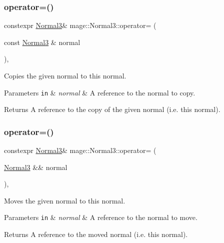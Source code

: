 \subsubsection{\texorpdfstring{operator=()}{operator=()}\hspace{0.1cm}{\footnotesize\ttfamily [1/2]}}
{\footnotesize\ttfamily constexpr \hyperlink{structmage_1_1_normal3}{Normal3}\& mage\+::\+Normal3\+::operator= (\begin{DoxyParamCaption}\item[{const \hyperlink{structmage_1_1_normal3}{Normal3} \&}]{normal }\end{DoxyParamCaption})\hspace{0.3cm}{\ttfamily [default]}, {\ttfamily [noexcept]}}

Copies the given normal to this normal.


\begin{DoxyParams}[1]{Parameters}
\mbox{\tt in}  & {\em normal} & A reference to the normal to copy. \\
\hline
\end{DoxyParams}
\begin{DoxyReturn}{Returns}
A reference to the copy of the given normal (i.\+e. this normal). 
\end{DoxyReturn}
\hypertarget{structmage_1_1_normal3_a59aca1c2a1eb936c36bce64b4b5936b9}{}\label{structmage_1_1_normal3_a59aca1c2a1eb936c36bce64b4b5936b9} 
\subsubsection{\texorpdfstring{operator=()}{operator=()}\hspace{0.1cm}{\footnotesize\ttfamily [2/2]}}
{\footnotesize\ttfamily constexpr \hyperlink{structmage_1_1_normal3}{Normal3}\& mage\+::\+Normal3\+::operator= (\begin{DoxyParamCaption}\item[{\hyperlink{structmage_1_1_normal3}{Normal3} \&\&}]{normal }\end{DoxyParamCaption})\hspace{0.3cm}{\ttfamily [default]}, {\ttfamily [noexcept]}}

Moves the given normal to this normal.


\begin{DoxyParams}[1]{Parameters}
\mbox{\tt in}  & {\em normal} & A reference to the normal to move. \\
\hline
\end{DoxyParams}
\begin{DoxyReturn}{Returns}
A reference to the moved normal (i.\+e. this normal). 
\end{DoxyReturn}
